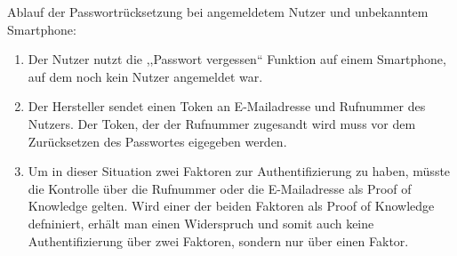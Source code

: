 \begin{itemize}[leftmargin=0cm,label={}]
\begin{enumerate}[noitemsep]
                \end{enumerate}
                \indent Ablauf der Passwortrücksetzung bei angemeldetem Nutzer und unbekanntem Smartphone:
                \begin{enumerate}[noitemsep]
                    \item Der Nutzer nutzt die ,,Passwort vergessen`` Funktion auf einem Smartphone, auf dem noch kein Nutzer angemeldet war.
                    \item Der Hersteller sendet einen Token an E-Mailadresse und Rufnummer des Nutzers.
                        Der Token, der der Rufnummer zugesandt wird muss vor dem Zurücksetzen des Passwortes eigegeben werden.
                    \item Um in dieser Situation zwei Faktoren zur Authentifizierung zu haben, müsste die Kontrolle über die Rufnummer oder die E-Mailadresse als Proof of Knowledge gelten.
                        Wird einer der beiden Faktoren als Proof of Knowledge defniniert, erhält man einen Widerspruch und somit auch keine Authentifizierung über zwei Faktoren, sondern nur über einen Faktor.\cite{Jmaxxz2015}
                \end{enumerate}
        \end{itemize}
        

